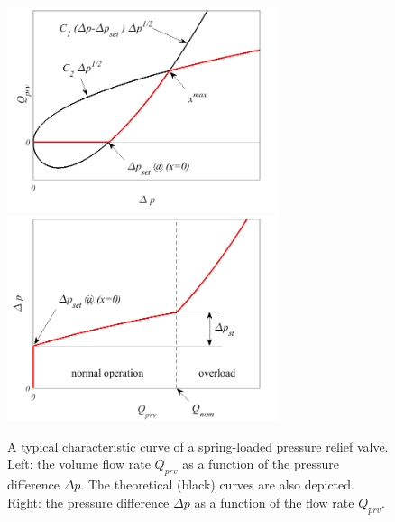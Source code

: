\begin{figure}[ht!]
	\centering
		\includegraphics[width=8cm]{PositiveDisplacementPumps/Figures/Characteristic_Curves_Of_Pressure_Relief_Valves_Dp_Q.png}
		\includegraphics[width=8cm]{PositiveDisplacementPumps/Figures/Characteristic_Curves_Of_Pressure_Relief_Valves_Q_Dp.png}
	\caption{A typical characteristic curve of a spring-loaded pressure relief valve. Left: the volume flow rate $Q_{prv}$ as a function of the pressure difference $\Delta p$. The theoretical (black) curves are also depicted. Right: the pressure difference $\Delta p$ as a function of the flow rate $Q_{prv}$.}
	\label{fig:characteristic_curve_of_PRV}
\end{figure}

